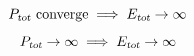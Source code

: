\begin{mdframed}[style=PropertyFrame]
    \begin{prop}
    \end{prop}
    \begin{equation*}
        {{P}_\textsl{{tot}}} \text{ converge} \implies {{E}_\textsl{{tot}}} \to \infty
    \end{equation*}
\end{mdframed}

\begin{mdframed}[style=PropertyFrame]
    \begin{prop}
    \end{prop}
    \begin{equation*}
        {{P}_\textsl{{tot}}} \to \infty \implies {{E}_\textsl{{tot}}} \to \infty
    \end{equation*}
\end{mdframed}